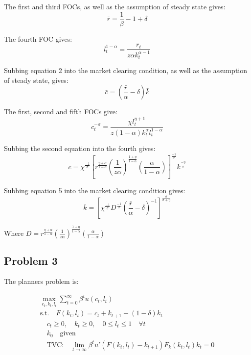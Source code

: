 \documentclass{article}
\begin{document}
The first and third FOCs, as well as the assumption of steady state gives: 
\begin{equation}
    \bar{r} = \frac{1}{\beta} - 1 + \delta
\end{equation}

The fourth FOC gives:
\begin{equation}
    l_t^{1-\alpha} = \frac{r_t}{z \alpha k_t^{\alpha - 1}} 
\end{equation}

Subbing equation 2 into the market clearing condition, as well as the assumption of steady state, gives: 
\begin{equation}
    \bar{c} = (\frac{\bar{r}}{\alpha} - \delta) \bar{k}
\end{equation}

The first, second and fifth FOCs give: 
\begin{equation}
    c_t^{-\sigma} = \frac{\chi l_t^{\eta+1}}{z(1-\alpha) k_t^\alpha l_t^{1-\alpha}}
\end{equation}

Subbing the second equation into the fourth gives:
\begin{equation}
    \bar{c} = \chi^{\frac{-1}{\sigma}} [r^{\frac{\eta + \alpha}{1-\alpha}}(\frac{1}{z\alpha})^{\frac{1+\eta}{1-\alpha}}
    (\frac{\alpha}{1-\alpha})]^{\frac{-1}{\sigma}} k^{\frac{-\eta}{\sigma}}
\end{equation}

Subbing equation 5 into the market clearing condition gives: 
\begin{equation}
    \bar{k} = [\chi^{\frac{-1}{\sigma}} D^{\frac{-1}{\sigma}}(\frac{\bar{r}}{\alpha}-\delta)^{-1}]^{\frac{\sigma}{\sigma+\eta}}
\end{equation}

Where $D = r^{\frac{\eta + \alpha}{1-\alpha}}(\frac{1}{z\alpha})^{\frac{1+\eta}{1-\alpha}}(\frac{\alpha}{1-\alpha})$

\subsection*{Problem 3}
The planners problem is: 

\begin{gather*}
    \max_{c_t, k_t, l_t} \sum_{t=0}^{\infty} \beta^t u(c_t, l_t) \\
    \text{s.t.} \quad F(k_t, l_t) = c_t + k_{t+1} - (1 - \delta) k_t \\
    \quad c_t \geq 0, \quad k_t \geq 0, \quad 0 \leq l_t \leq 1 \quad \forall t \\
    \quad k_0 \quad \text{given} \\
    \quad \text{TVC:} \quad \lim_{t \rightarrow \infty} \beta^t u'(F(k_t, l_t) - k_{t+1})F_k(k_t, l_t)k_t = 0 
\end{gather*}
\end{document}
